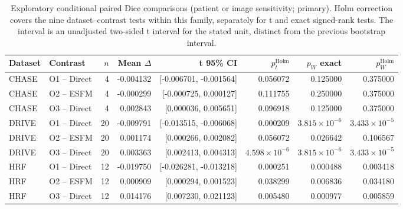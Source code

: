 \begin{table}[p]
\caption{Exploratory conditional paired Dice comparisons (patient or image sensitivity; primary). Holm correction covers the nine dataset--contrast tests within this family, separately for t and exact signed-rank tests. The interval is an unadjusted two-sided t interval for the stated unit, distinct from the previous bootstrap interval.}\label{tab:completion-patient_or_image_sensitivity-primary}
\centering\scriptsize\setlength{\tabcolsep}{3pt}
\begin{tabular}{llrrrrrr}
\toprule
Dataset & Contrast & $n$ & Mean $\Delta$ & t 95\% CI & $p_t^{\mathrm{Holm}}$ & $p_W$ exact & $p_W^{\mathrm{Holm}}$ \\
\midrule
CHASE & O1 -- Direct & 4 & -0.004132 & [-0.006701, -0.001564] & 0.056072 & 0.125000 & 0.375000 \\
CHASE & O2 -- ESFM & 4 & -0.000299 & [-0.000725, 0.000127] & 0.111755 & 0.250000 & 0.375000 \\
CHASE & O3 -- Direct & 4 & 0.002843 & [0.000036, 0.005651] & 0.096918 & 0.125000 & 0.375000 \\
DRIVE & O1 -- Direct & 20 & -0.009791 & [-0.013515, -0.006068] & 0.000209 & $3.815\times10^{-6}$ & $3.433\times10^{-5}$ \\
DRIVE & O2 -- ESFM & 20 & 0.001174 & [0.000266, 0.002082] & 0.056072 & 0.026642 & 0.106567 \\
DRIVE & O3 -- Direct & 20 & 0.003363 & [0.002413, 0.004313] & $4.598\times10^{-6}$ & $3.815\times10^{-6}$ & $3.433\times10^{-5}$ \\
HRF & O1 -- Direct & 12 & -0.019750 & [-0.026281, -0.013218] & 0.000251 & 0.000488 & 0.003418 \\
HRF & O2 -- ESFM & 12 & 0.000909 & [0.000294, 0.001523] & 0.038299 & 0.006836 & 0.034180 \\
HRF & O3 -- Direct & 12 & 0.014176 & [0.007230, 0.021123] & 0.005480 & 0.000977 & 0.005859 \\
\bottomrule
\end{tabular}
\end{table}

